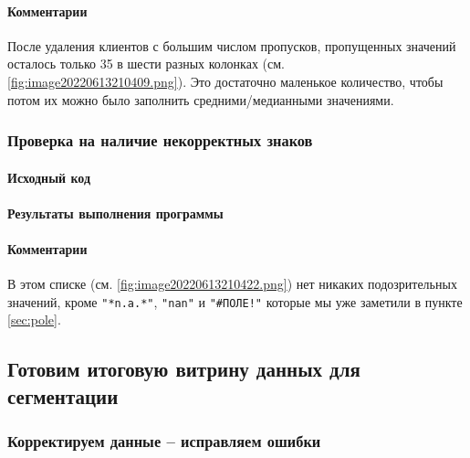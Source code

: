 \documentclass[12pt,a4paper]{article}
\begin{document}
  \paragraph*{Комментарии}
  После удаления клиентов с большим числом пропусков, пропущенных значений
  осталось только 35 в шести разных колонках (см. \autoref{fig:image20220613210409.png}). Это достаточно маленькое
  количество, чтобы потом их можно было заполнить средними/медианными
  значениями.

  \subsubsection{Проверка на наличие некорректных знаков}
  \paragraph*{Исходный код}
\begin{Shaded}
\begin{Highlighting}[]
\NormalTok{np.unique([x }\NormalTok{ data[col].unique()])}
\end{Highlighting}
\end{Shaded}

  \paragraph*{Результаты выполнения программы}

  \paragraph*{Комментарии}
  В этом списке (см. \autoref{fig:image20220613210422.png}) нет никаких подозрительных значений, кроме
  \texttt{"*n.a.*"}, \texttt{"nan"} и \texttt{"\#ПОЛЕ!"} которые мы уже
  заметили в пункте \ref{sec:pole}.

  \subsection{Готовим итоговую витрину данных для сегментации}
  \subsubsection{Корректируем данные -- исправляем ошибки}
\end{document}
